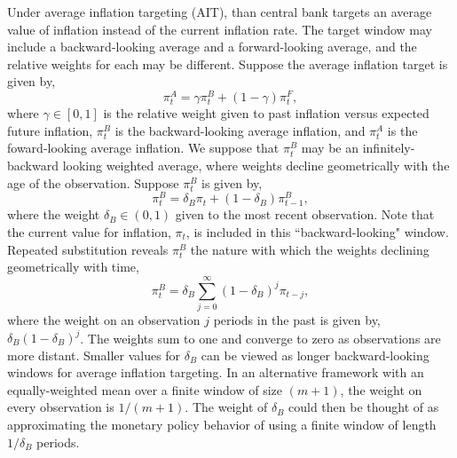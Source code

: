\documentclass[english,authoryear,12pt]{elsarticle}
\begin{document}
Under average inflation targeting (AIT), than central bank targets an average value of inflation instead of the current inflation rate. The target window may include a backward-looking average and a forward-looking average, and the relative weights for each may be different. Suppose the average inflation target is given by,
\begin{equation}
	\pi_t^A = \gamma \pi_t^B + (1-\gamma) \pi_t^F,
\end{equation}
where $\gamma \in [0,1]$ is the relative weight given to past inflation versus expected future inflation, $\pi_t^B$ is the backward-looking average inflation, and $\pi_t^A$ is the foward-looking average inflation. We suppose that $\pi_t^B$ may be an infinitely-backward looking weighted average, where weights decline geometrically with the age of the observation. Suppose $\pi_t^B$ is given by,
\begin{equation}\label{eq:backward}
	\pi_t^B = \delta_B \pi_t + (1-\delta_B) \pi_{t-1}^B,
\end{equation}
where the weight $\delta_B \in (0,1)$ given to the most recent observation. Note that the current value for inflation, $\pi_t$, is included in this ``backward-looking" window.  Repeated substitution reveals $\pi_t^B$ the nature with which the weights declining geometrically with time,
\begin{equation}\label{eq:backward_all}
	\pi_t^B = \delta_B \sum_{j=0}^{\infty} (1-\delta_B)^j \pi_{t-j},
\end{equation}
where the weight on an observation $j$ periods in the past is given by, $\delta_B (1-\delta_B)^j$. The weights sum to one and converge to zero as observations are more distant. Smaller values for $\delta_B$ can be viewed as longer backward-looking windows for average inflation targeting. In an alternative framework with an equally-weighted mean over a finite window of size $(m+1)$, the weight on every observation is $1/(m+1)$. The weight of $\delta_B$ could then be thought of as approximating the monetary policy behavior of using a finite window of length $1 / \delta_B$ periods.
\end{document}
